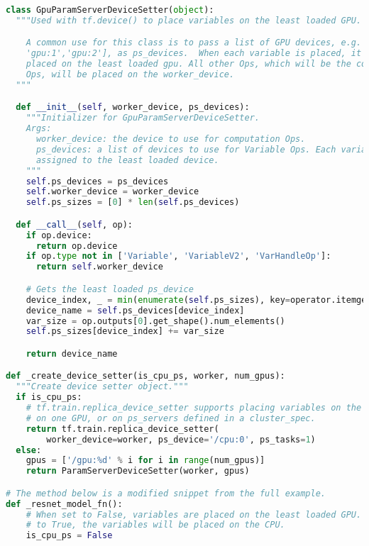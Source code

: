 \begin{lstlisting}[language=Python]
class GpuParamServerDeviceSetter(object):
  """Used with tf.device() to place variables on the least loaded GPU.

    A common use for this class is to pass a list of GPU devices, e.g. ['gpu:0',
    'gpu:1','gpu:2'], as ps_devices.  When each variable is placed, it will be
    placed on the least loaded gpu. All other Ops, which will be the computation
    Ops, will be placed on the worker_device.
  """

  def __init__(self, worker_device, ps_devices):
    """Initializer for GpuParamServerDeviceSetter.
    Args:
      worker_device: the device to use for computation Ops.
      ps_devices: a list of devices to use for Variable Ops. Each variable is
      assigned to the least loaded device.
    """
    self.ps_devices = ps_devices
    self.worker_device = worker_device
    self.ps_sizes = [0] * len(self.ps_devices)

  def __call__(self, op):
    if op.device:
      return op.device
    if op.type not in ['Variable', 'VariableV2', 'VarHandleOp']:
      return self.worker_device

    # Gets the least loaded ps_device
    device_index, _ = min(enumerate(self.ps_sizes), key=operator.itemgetter(1))
    device_name = self.ps_devices[device_index]
    var_size = op.outputs[0].get_shape().num_elements()
    self.ps_sizes[device_index] += var_size

    return device_name

def _create_device_setter(is_cpu_ps, worker, num_gpus):
  """Create device setter object."""
  if is_cpu_ps:
    # tf.train.replica_device_setter supports placing variables on the CPU, all
    # on one GPU, or on ps_servers defined in a cluster_spec.
    return tf.train.replica_device_setter(
        worker_device=worker, ps_device='/cpu:0', ps_tasks=1)
  else:
    gpus = ['/gpu:%d' % i for i in range(num_gpus)]
    return ParamServerDeviceSetter(worker, gpus)

# The method below is a modified snippet from the full example.
def _resnet_model_fn():
    # When set to False, variables are placed on the least loaded GPU. If set
    # to True, the variables will be placed on the CPU.
    is_cpu_ps = False


\end{lstlisting}
